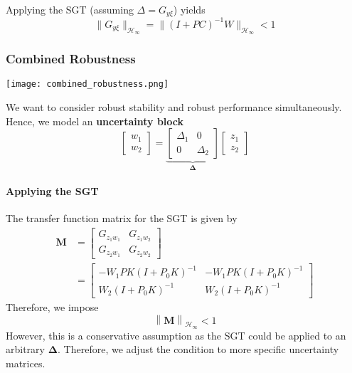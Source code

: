 Applying the SGT (assuming $\Delta=G_{y\xi}$) yields
\begin{equation*}
    \|G_{y\xi}\|_{\mathcal{H}_\infty}=\|(I+PC)^{-1}W\|_{\mathcal{H}_\infty}<1
\end{equation*}

\subsubsection{Combined Robustness}
\begin{center}
    \texttt{[image: combined\_robustness.png]}
\end{center}
We want to consider robust stability and robust performance simultaneously. Hence, we model an \textbf{uncertainty block}
\begin{equation*}
    \begin{bmatrix}
        w_1 \\
        w_2
    \end{bmatrix}
    =\underbrace{\begin{bmatrix}
            \Delta_1 & 0        \\
            0        & \Delta_2
        \end{bmatrix}}_{\boldsymbol{\Delta}}
    \begin{bmatrix}z_1 \\
        z_2
    \end{bmatrix}
\end{equation*}

\paragraph{Applying the SGT}

The transfer function matrix for the SGT is given by
\begin{align*}
    \mathbf{M} & =
    \begin{bmatrix}
        G_{{z_{1}w_{1}}} & G_{{z_{1}w_{2}}} \\
        G_{{z_{2}w_{1}}} & G_{{z_{2}w_{2}}}
    \end{bmatrix}                     \\
               & =\begin{bmatrix}
                      -W_1PK(I+P_0K)^{-1} & -W_1PK(I+P_0K)^{-1} \\
                      W_2(I+P_0K)^{-1}    & W_2(I+P_0K)^{-1}
                  \end{bmatrix}
\end{align*}
Therefore, we impose
\begin{equation*}
    \left\|\mathbf{M}\right\|_{\mathcal{H}_\infty}<1
\end{equation*}
However, this is a conservative assumption as the SGT could be applied to an arbitrary $\boldsymbol{\Delta}$. Therefore, we adjust the condition to more specific uncertainty matrices.

